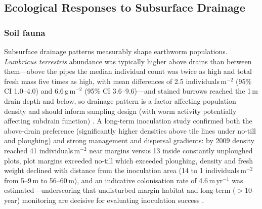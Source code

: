 \documentclass[11pt]{article}
\begin{document}
\subsection{Ecological Responses to Subsurface Drainage}

\subsubsection{Soil fauna}
Subsurface drainage patterns measurably shape earthworm populations. \textit{Lumbricus terrestris} abundance was typically higher above drains than between them---above the pipes the median individual count was twice as high and total fresh mass five times as high, with mean differences of 2.5 individuals\,m$^{-2}$ (95\% CI 1.0--4.0) and 6.6\,g\,m$^{-2}$ (95\% CI 3.6--9.6)---and stained burrows reached the 1\,m drain depth and below, so drainage pattern is a factor affecting population density and should inform sampling design (with worm activity potentially affecting subdrain function) \parencite{Nuutinen2001}. A long-term inoculation study confirmed both the above-drain preference (significantly higher densities above tile lines under no-till and ploughing) and strong management and dispersal gradients: by 2009 density reached 41 individuals\,m$^{-2}$ near margins versus 13 inside constantly unploughed plots, plot margins exceeded no-till which exceeded ploughing, density and fresh weight declined with distance from the inoculation area (14 to 1 individuals\,m$^{-2}$ from 5--9\,m to 56--60\,m), and an indicative colonisation rate of 4.6\,m\,yr$^{-1}$ was estimated---underscoring that undisturbed margin habitat and long-term ($>$10-year) monitoring are decisive for evaluating inoculation success \parencite{Nuutinen2011}.
\end{document}
